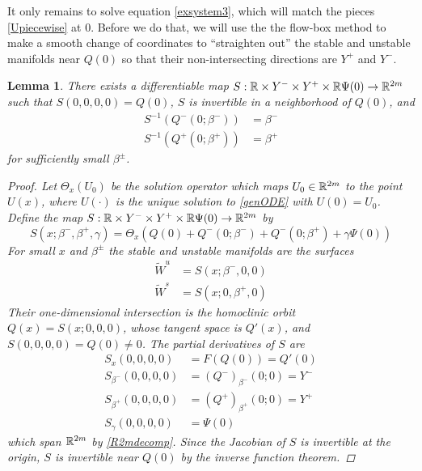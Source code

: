 \documentclass[10pt,reqno]{amsart}
\theoremstyle{plain}
\newtheorem{lemma}[theorem]{Lemma}
\theoremstyle{definition}
\theoremstyle{remark}
\numberwithin{theorem}{section}
\numberwithin{equation}{section}
\begin{document}
It only remains to solve equation \eqref{exsystem3}, which will match the pieces \eqref{Upiecewise} at $0$. Before we do that, we will use the the flow-box method to make a smooth change of coordinates to ``straighten out'' the stable and unstable manifolds near $Q(0)$ so that their non-intersecting directions are $Y^+$ and $Y^-$.

\begin{lemma}\label{straightenW}
There exists a differentiable map $S: \mathbb{R} \times Y^- \times Y^+ \times \mathbb{R} \Psi(0) \rightarrow \mathbb{R}^{2m}$ such that $S(0, 0, 0, 0) = Q(0)$, $S$ is invertible in a neighborhood of $Q(0)$, and
\begin{align*}
S^{-1}(Q^-(0; \beta^-)) &= \beta^-  \\
S^{-1}(Q^+(0; \beta^+)) &= \beta^+ 
\end{align*}
for sufficiently small $\beta^\pm$.
\begin{proof}
Let $\Theta_x(U_0)$ be the solution operator which maps $U_0 \in \mathbb{R}^{2m}$ to the point $U(x)$, where $U(\cdot)$ is the unique solution to \eqref{genODE} with $U(0) = U_0$. Define the map $S: \mathbb{R} \times Y^- \times Y^+ \times \mathbb{R} \Psi(0) \rightarrow \mathbb{R}^{2m}$ by 
\begin{equation}\label{flowboxdefS}
S(x; \beta^-, \beta^+, \gamma) = \Theta_x\left(Q(0) + Q^-(0; \beta^-) + Q^-(0; \beta^+) + \gamma \Psi(0)\right)
\end{equation}
For small $x$ and $\beta^\pm$ the stable and unstable manifolds are the surfaces
\begin{align*}
\tilde{W}^u &= S(x; \beta^-, 0, 0) \\
\tilde{W}^s &= S(x; 0, \beta^+, 0) 
\end{align*}
Their one-dimensional intersection is the homoclinic orbit $Q(x) = S(x; 0, 0, 0)$, whose tangent space is $Q'(x)$, and $S(0, 0, 0, 0) = Q(0) \neq 0$. The partial derivatives of $S$ are
\begin{align*}
S_x(0, 0, 0, 0) &= F(Q(0)) = Q'(0) \\
S_{\beta^-}(0, 0, 0, 0) &= (Q^-)_{\beta^-}(0; 0) = Y^- \\
S_{\beta^+}(0, 0, 0, 0) &= (Q^+)_{\beta^+}(0; 0) = Y^+ \\
S_{\gamma}(0, 0, 0, 0) &= \Psi(0)
\end{align*}
which span $\mathbb{R}^{2m}$ by \cref{R2mdecomp}. Since the Jacobian of $S$ is invertible at the origin, $S$ is invertible near $Q(0)$ by the inverse function theorem.
\end{proof}
\end{lemma}
\end{document}
